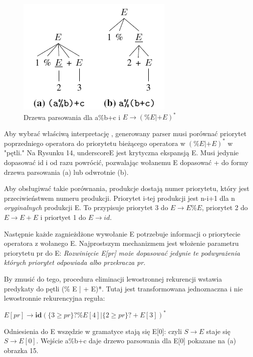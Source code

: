\begin{figure}[h]
\includegraphics[scale=0.67]{Figure14.png}
\caption{Drzewa parsowania dla a\%b+c i $E\rightarrow(\%E|+E)^* $}
\end{figure}

Aby wybrać właściwą interpretację , generowany parser
musi porównać priorytet poprzedniego operatora do priorytetu bieżącego operatora
w $(\% E | + E)^*$ w "pętli." Na Rysunku 14, underscore{E} jest krytyczna ekspansją E.
Musi jedynie dopasować id i od
razu powrócić, pozwalając wołanemu E dopasować + do formy drzewa parsowania (a) lub odwrotnie (b).
\par
Aby obsługiwać takie porównania, produkcje dostają numer priorytetu, który jest przeciwieństwem numeru 
produkcji. Priorytet i-tej produkcji jest n-i+1 dla n \textit{oryginalnych} produkcji E.
To przypisuje priorytet 3 do $E \rightarrow E \%E$, priorytet 2 do
$E \rightarrow E + E$ i priortyet 1 do $E \rightarrow id$.
\par
Następnie każde zagnieżdżone wywołanie E potrzebuje informacji 
o priorytecie operatora z wołanego E. Najprostszym mechanizmem
jest włożenie parametru priorytetu pr do E:
\textit{Rozwinięcie E[pr] może dopasować jedynie te podwyrażenia
których priorytet odpowiada albo przekracza pr.}
\par
By zmusić do tego, procedura eliminacji lewostronnej rekurencji 
wstawia predykaty do pętli (\% E | + E)*. Tutaj jest transformowana
jednoznaczna i nie lewostronnie rekurencyjna reguła:
\par
$E[pr] \rightarrow \textbf{id} (\{ 3 \geq pr\}? \%E[4]| \{ 2 \geq pr\}?+E[3])^*$
\par
Odniesienia do E wszędzie w gramatyce stają się E[0]: czyli $S\rightarrow E$ staje się $S\rightarrow E[0]$.
Wejście a\%b+c daje drzewo parsowania dla E[0] pokazane na (a) obrazka 15.
